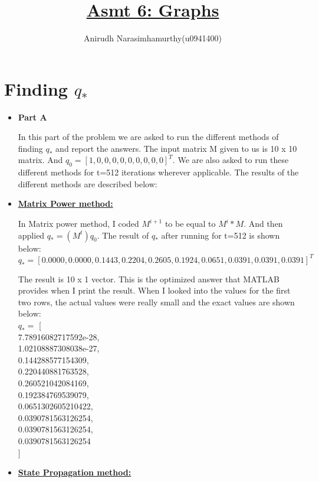 \documentclass[11pt]{article}
\title{\textbf{\underline{Asmt 6: Graphs}}}
\author{Anirudh Narasimhamurthy(u0941400)}
\begin{document}
\maketitle

\section{Finding $q_*$}

\begin{itemize}
	
	\item[] \textbf{Part A}
	
	In this part of the problem we are asked to run the different methods of finding $q_*$ and report the answers. The input matrix M given to us is 10 x 10 matrix. And $q_0 = [1, 0, 0, 0, 0, 0, 0, 0, 0, 0]^T$. We are also asked to run these different methods for t=512 iterations wherever applicable. The results of the different methods are described below:
	
	\item [] \textbf{\underline{Matrix Power method:}}
	
	In Matrix power method, I coded $M^{i+1}$ to be equal to $M^i * M $. And then applied $q_*=(M^t)q_0$. The result of $q_*$ after running for t=512 is shown below:\\
	
	$\boxed{q_*=
	[
	0.0000,
	0.0000,
	0.1443,
	0.2204,
	0.2605,
	0.1924,
	0.0651,
	0.0391,
	0.0391,
	0.0391
	]^T}$
	
	The result is 10 x 1 vector. This is the optimized answer that MATLAB provides when I print the result. When I looked into the values for the first two rows, the actual values were really small and the exact values are shown below:\\
	$q_* =$
	[\\
	7.78916082717592e-28,\\
	1.02108887308038e-27,\\
	0.144288577154309,\\
	0.220440881763528,\\
	0.260521042084169,\\
	0.192384769539079,\\
	0.0651302605210422,\\
	0.0390781563126254,\\
	0.0390781563126254,\\
	0.0390781563126254\\
	]
	
	\item [] \textbf{\underline{State Propagation method:}}
	

\end{itemize}
\end{document}
